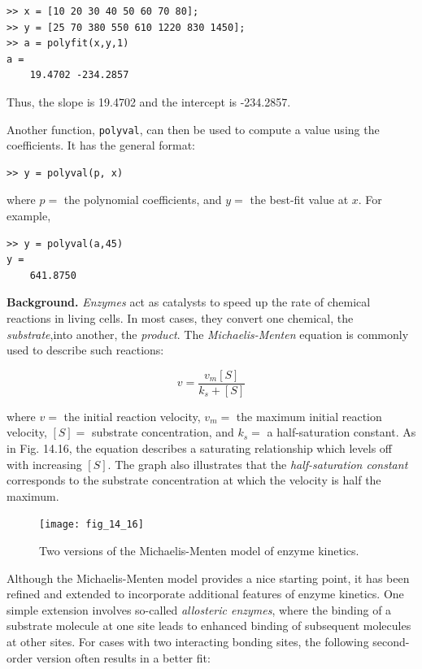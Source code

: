 \documentclass[../main.tex]{subfiles}
\begin{document}
\begin{lstlisting}[numbers=none]
>> x = [10 20 30 40 50 60 70 80];
>> y = [25 70 380 550 610 1220 830 1450];
>> a = polyfit(x,y,1)
a =
	19.4702 -234.2857
\end{lstlisting}

\noindent Thus, the slope is 19.4702 and the intercept is -234.2857.

Another function, \texttt{polyval}, can then be used to compute a value using the coefficients. It has the general format:

\begin{lstlisting}[numbers=none]
>> y = polyval(p, x)
\end{lstlisting}

\noindent where $p =$ the polynomial coefficients, and $y =$ the best-fit value at $x$. For example,

\begin{lstlisting}[numbers=none]
>> y = polyval(a,45)
y =
	641.8750
\end{lstlisting}

\bigskip

\textbf{Background.} \textit{Enzymes} act as catalysts to speed up the rate of chemical reactions in living cells. In most cases, they convert one chemical, the \textit{substrate},into another, the \textit{product}. The \textit{Michaelis-Menten} equation is commonly used to describe such reactions:

\begin{equation}
	\tag{14.28}
	v = \frac{v_m[S]}{k_s + [S]}
\end{equation}

\noindent where $v =$ the initial reaction velocity, $v_m =$ the maximum initial reaction velocity, $[S] =$ substrate concentration, and $k_s =$ a half-saturation constant. As in Fig. 14.16, the equation describes a saturating relationship which levels off with increasing $[S]$. The graph also illustrates that the \textit{half-saturation constant} corresponds to the substrate concentration at which the velocity is half the maximum.

\begin{figure}[H] %
	\centering
	\texttt{[image: fig\_14\_16]}
	\caption{\textsf{Two versions of the Michaelis-Menten model of enzyme kinetics.}}
	\label{fig:fig_14_16}
\end{figure}

Although the Michaelis-Menten model provides a nice starting point, it has been refined and extended to incorporate additional features of enzyme kinetics. One simple extension involves so-called \textit{allosteric enzymes}, where the binding of a substrate molecule at one site leads to enhanced binding of subsequent molecules at other sites. For cases with two interacting bonding sites, the following second-order version often results in a better fit:
\end{document}
